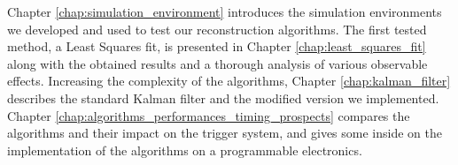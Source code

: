 	Chapter \ref{chap:simulation_environment} introduces the simulation environments we developed and used to test our reconstruction algorithms. The first tested method, a Least Squares fit, is presented in Chapter \ref{chap:least_squares_fit} along with the obtained results and a thorough analysis of various observable effects. Increasing the complexity of the algorithms, Chapter \ref{chap:kalman_filter} describes the standard Kalman filter and the modified version we implemented. Chapter \ref{chap:algorithms_performances_timing_prospects} compares the algorithms and their impact on the trigger system, and gives some inside on the implementation of the algorithms on a programmable electronics.